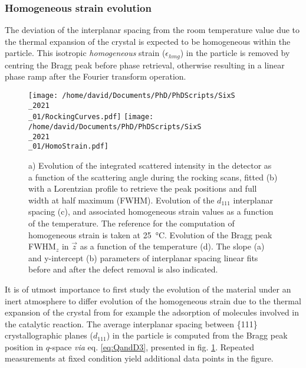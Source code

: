 \subsubsection{Homogeneous strain evolution}

The deviation of the interplanar spacing from the room temperature value due to the thermal expansion of the crystal is expected to be homogeneous within the particle.
This isotropic \textit{homogeneous} strain ($\epsilon_{hmg}$) in the particle is removed by centring the Bragg peak before phase retrieval, otherwise resulting in a linear phase ramp after the Fourier transform operation.


\begin{figure}[!htb]
    \centering
    \texttt{[image: /home/david/Documents/PhD/PhDScripts/SixS\\\_2021\\\_01/RockingCurves.pdf]}
    \texttt{[image: /home/david/Documents/PhD/PhDScripts/SixS\\\_2021\\\_01/HomoStrain.pdf]}
    \caption{
        a) Evolution of the integrated scattered intensity in the detector as a function of the scattering angle during the rocking scans, fitted (b) with a Lorentzian profile to retrieve the peak positions and full width at half maximum (FWHM).
        Evolution of the $d_{111}$ interplanar spacing (c), and associated homogeneous strain values as a function of the temperature.
        The reference for the computation of homogeneous strain is taken at \qty{25}{\degreeCelsius}.
        Evolution of the Bragg peak FWHM$_z$ in $\vec{z}$ as a function of the temperature (d).
        The slope (a) and y-intercept (b) parameters of interplanar spacing linear fits before and after the defect removal is also indicated.
    }
    \label{fig:AmaterasuHomoStrain}
\end{figure}

It is of utmost importance to first study the evolution of the material under an inert atmosphere to differ evolution of the homogeneous strain due to the thermal expansion of the crystal from for example the adsorption of molecules involved in the catalytic reaction.
The average interplanar spacing between \{111\} crystallographic planes ($d_{111}$) in the particle is computed from the Bragg peak position in $q$-space \textit{via} eq. \ref{eq:QandD3}, presented in fig. \ref{fig:AmaterasuHomoStrain}.
Repeated measurements at fixed condition yield additional data points in the figure.

